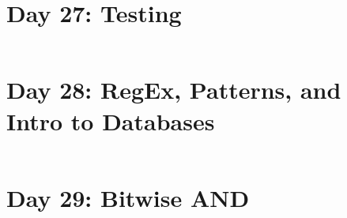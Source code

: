 \documentclass[11pt,a4paper]{article}
\begin{document}
\newpage
\section{Day 27: Testing}
\begin{lstlisting}
\end{lstlisting}

\newpage
\section{Day 28: RegEx, Patterns, and Intro to Databases}
\begin{lstlisting}
\end{lstlisting}

\newpage
\section{Day 29: Bitwise AND}
\begin{lstlisting}
\end{lstlisting}
\end{document}
